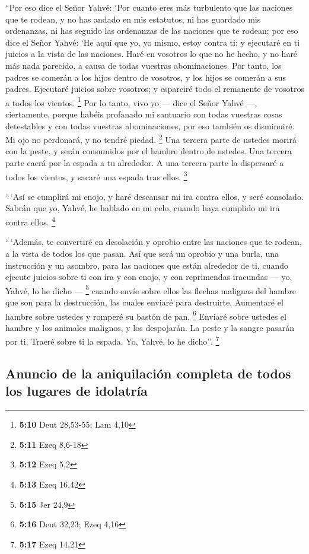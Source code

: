  ``Por eso dice el Señor Yahvé: `Por cuanto eres más
turbulento que las naciones que te rodean, y no has andado en mis
estatutos, ni has guardado mis ordenanzas, ni has seguido las ordenanzas
de las naciones que te rodean;  por eso dice el Señor
Yahvé: `He aquí que yo, yo mismo, estoy contra ti; y ejecutaré en ti
juicios a la vista de las naciones.  Haré en vosotros lo
que no he hecho, y no haré más nada parecido, a causa de todas vuestras
abominaciones.  Por tanto, los padres se comerán a los
hijos dentro de vosotros, y los hijos se comerán a sus padres. Ejecutaré
juicios sobre vosotros; y esparciré todo el remanente de vosotros a
todos los vientos. \footnote{\textbf{5:10} Deut 28,53-55; Lam 4,10}
 Por lo tanto, vivo yo --- dice el Señor Yahvé ---,
ciertamente, porque habéis profanado mi santuario con todas vuestras
cosas detestables y con todas vuestras abominaciones, por eso también os
disminuiré. Mi ojo no perdonará, y no tendré piedad. \footnote{\textbf{5:11}
  Ezeq 8,6-18}  Una tercera parte de ustedes morirá con
la peste, y serán consumidos por el hambre dentro de ustedes. Una
tercera parte caerá por la espada a tu alrededor. A una tercera parte la
dispersaré a todos los vientos, y sacaré una espada tras ellos.
\footnote{\textbf{5:12} Ezeq 5,2}

 ``\,`Así se cumplirá mi enojo, y haré descansar mi ira
contra ellos, y seré consolado. Sabrán que yo, Yahvé, he hablado en mi
celo, cuando haya cumplido mi ira contra ellos. \footnote{\textbf{5:13}
  Ezeq 16,42}

 ``\,`Además, te convertiré en desolación y oprobio entre
las naciones que te rodean, a la vista de todos los que pasan.
 Así que será un oprobio y una burla, una instrucción y
un asombro, para las naciones que están alrededor de ti, cuando ejecute
juicios sobre ti con ira y con enojo, y con reprimendas iracundas ---
yo, Yahvé, lo he dicho --- \footnote{\textbf{5:15} Jer 24,9}
 cuando envíe sobre ellos las flechas malignas del hambre
que son para la destrucción, las cuales enviaré para destruirte.
Aumentaré el hambre sobre ustedes y romperé su bastón de pan.
\footnote{\textbf{5:16} Deut 32,23; Ezeq 4,16}  Enviaré
sobre ustedes el hambre y los animales malignos, y los despojarán. La
peste y la sangre pasarán por ti. Traeré sobre ti la espada. Yo, Yahvé,
lo he dicho''. \footnote{\textbf{5:17} Ezeq 14,21}

\hypertarget{anuncio-de-la-aniquilaciuxf3n-completa-de-todos-los-lugares-de-idolatruxeda}{%
\subsection{Anuncio de la aniquilación completa de todos los lugares de
idolatría}\label{anuncio-de-la-aniquilaciuxf3n-completa-de-todos-los-lugares-de-idolatruxeda}}

